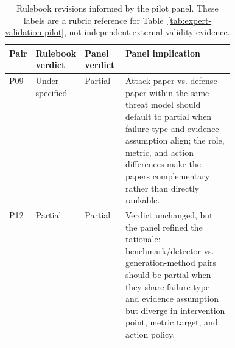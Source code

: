 \begin{table}[t]
\centering
\scriptsize
\renewcommand{\arraystretch}{0.9}
\begin{tabularx}{\linewidth}{>{\raggedright\arraybackslash}p{0.09\linewidth}>{\raggedright\arraybackslash}p{0.16\linewidth}>{\raggedright\arraybackslash}p{0.18\linewidth}X}
\toprule
\textbf{Pair} & \textbf{Rulebook verdict} & \textbf{Panel verdict} & \textbf{Panel implication} \\
\midrule
P09 & Under-specified & Partial & Attack paper vs. defense paper within the same threat model should default to partial when failure type and evidence assumption align; the role, metric, and action differences make the papers complementary rather than directly rankable. \\
P12 & Partial & Partial & Verdict unchanged, but the panel refined the rationale: benchmark/detector vs. generation-method pairs should be partial when they share failure type and evidence assumption but diverge in intervention point, metric target, and action policy. \\
\bottomrule
\end{tabularx}
\caption{Rulebook revisions informed by the pilot panel. These labels are a rubric reference for Table~\ref{tab:expert-validation-pilot}, not independent external validity evidence.}
\label{tab:gold-adjudication-revisions}
\end{table}
